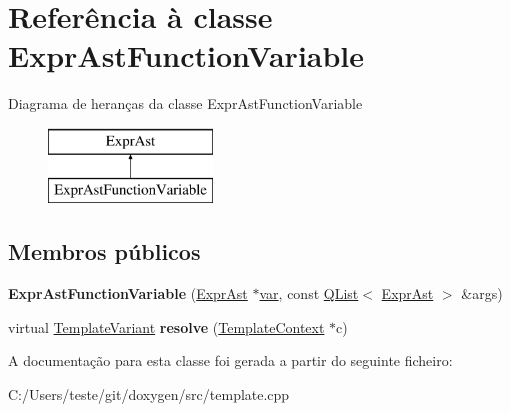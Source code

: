 \hypertarget{class_expr_ast_function_variable}{\section{Referência à classe Expr\-Ast\-Function\-Variable}
\label{class_expr_ast_function_variable}
}
Diagrama de heranças da classe Expr\-Ast\-Function\-Variable\begin{figure}[H]
\begin{center}
\leavevmode
\includegraphics[height=2.000000cm]{class_expr_ast_function_variable}
\end{center}
\end{figure}
\subsection*{Membros públicos}
\begin{DoxyCompactItemize}
\item 
\hypertarget{class_expr_ast_function_variable_a165ded8d778124ff2a7ebbd8fd0e38f0}{{\bfseries Expr\-Ast\-Function\-Variable} (\hyperlink{class_expr_ast}{Expr\-Ast} $\ast$\hyperlink{018__def_8c_a335628f2e9085305224b4f9cc6e95ed5}{var}, const \hyperlink{class_q_list}{Q\-List}$<$ \hyperlink{class_expr_ast}{Expr\-Ast} $>$ \&args)}\label{class_expr_ast_function_variable_a165ded8d778124ff2a7ebbd8fd0e38f0}

\item 
\hypertarget{class_expr_ast_function_variable_a19e3231655a2513f6467bc2b7cf1a9ed}{virtual \hyperlink{class_template_variant}{Template\-Variant} {\bfseries resolve} (\hyperlink{class_template_context}{Template\-Context} $\ast$c)}\label{class_expr_ast_function_variable_a19e3231655a2513f6467bc2b7cf1a9ed}

\end{DoxyCompactItemize}


A documentação para esta classe foi gerada a partir do seguinte ficheiro\-:\begin{DoxyCompactItemize}
\item 
C\-:/\-Users/teste/git/doxygen/src/template.\-cpp\end{DoxyCompactItemize}
